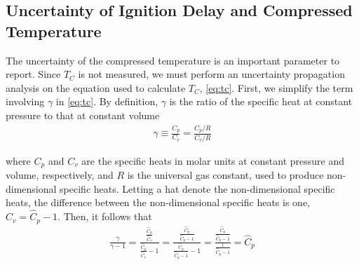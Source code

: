 \documentclass[../main.tex]{subfiles}
\begin{document}
\subsection{Uncertainty of Ignition Delay and Compressed Temperature}
\label{sec:uncertainty}

The uncertainty of the compressed temperature is an important parameter
to report. Since $T_C$ is not measured, we must perform an uncertainty
propagation analysis on the equation used to calculate $T_C$,
\cref{eq:tc}. First, we simplify the term involving $\gamma$ in
\cref{eq:tc}. By definition, $\gamma$ is the ratio of the specific heat
at constant pressure to that at constant volume
%
\begin{align}
\gamma \equiv \frac{C_p}{C_v} = \frac{C_p/R}{C_v/R}
\end{align}

where $C_p$ and $C_v$ are the specific heats in molar units at constant
pressure and volume, respectively, and $R$ is the universal gas constant,
used to produce non-dimensional specific heats. Letting a hat denote the
non-dimensional specific heats, the difference between the non-dimensional
specific heats is one, $\hat{C}_v = \hat{C}_p - 1$. Then, it follows that
%
\begin{align}
\label{eq:simplify-gamma}
\frac{\gamma}{\gamma - 1} = \frac{\frac{\hat{C}_p}{\hat{C}_v}}{\frac{\hat{C}_p}{\hat{C}_v} - 1}
= \frac{\frac{\hat{C}_p}{\hat{C}_p - 1}}{\frac{\hat{C}_p}{\hat{C}_p - 1} - 1}
= \frac{\frac{\hat{C}_p}{\hat{C}_p - 1}}{\frac{1}{\hat{C}_p - 1}}
= \hat{C}_p
\end{align}
\end{document}
